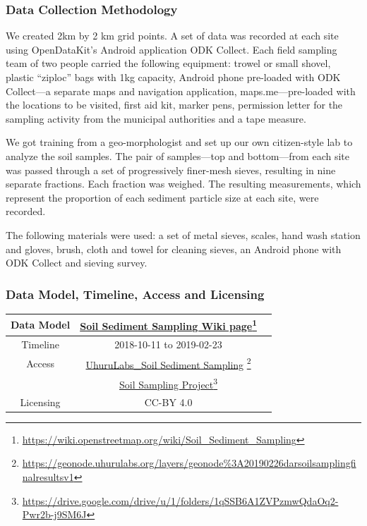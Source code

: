 \documentclass[a4paper,12pt,twoside]{article}
\begin{document}
\subsubsection{Data Collection Methodology}

\begin{multicols}{2}
We created 2km by 2 km grid points. A set of data was recorded at each site using OpenDataKit’s Android application ODK Collect. Each field sampling team of two people carried the following equipment: trowel or small shovel, plastic “ziploc” bags with 1kg capacity, Android phone pre-loaded with ODK Collect---a separate maps and navigation application, maps.me---pre-loaded with the locations to be visited, first aid kit, marker pens, permission letter for the sampling activity from the municipal authorities and a tape measure.

\medskip

We got training from a geo-morphologist and set up our own citizen-style lab to analyze the soil samples. The pair of samples—top and bottom—from each site was passed through a set of progressively finer-mesh sieves, resulting in nine separate fractions. Each fraction was weighed. The resulting measurements, which represent the proportion of each sediment particle size at each site, were
recorded.

The following materials were used: a set of metal sieves, scales, hand wash station and gloves, brush, cloth and towel for cleaning sieves, an Android phone with ODK Collect and sieving survey.
\end{multicols}

\subsubsection{Data Model, Timeline, Access and Licensing}
\begin{center}
  \begin{tabular}{|c|c|c|}  
 \hline
    Data Model    &   \href{https://wiki.openstreetmap.org/wiki/Soil_Sediment_Sampling}{Soil Sediment Sampling Wiki page}\footnote{\url{https://wiki.openstreetmap.org/wiki/Soil_Sediment_Sampling}} \\
 \hline
   Timeline  &   2018-10-11 to 2019-02-23 \\
 \hline  
 Access  & 
    \href{https://geonode.uhurulabs.org/layers/geonode\%3A_2019_02_26_dar_soil_sampling_final_results_v1}{UhuruLabs\_Soil Sediment Sampling} \footnote{\url{https://geonode.uhurulabs.org/layers/geonode\%3A20190226darsoilsamplingfinalresultsv1}}\\
{} & \href{https://drive.google.com/drive/u/1/folders/1qSSB6A1ZVPzmwQdaOq2-Pwr2b-j9SM6J}{Soil Sampling Project}\footnote{\url{https://drive.google.com/drive/u/1/folders/1qSSB6A1ZVPzmwQdaOq2-Pwr2b-j9SM6J}}\\ \hline
Licensing &  CC-BY 4.0 \\
 \hline
  
\end{tabular}
\end{center}
\end{document}
